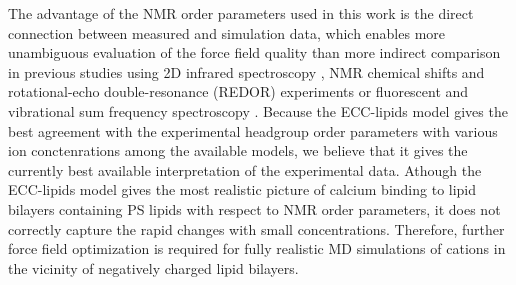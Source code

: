\documentclass[journal=jpcbfk,manuscript=article]{achemso}
\begin{document}


The advantage of the NMR order parameters used in this work is the direct connection between
measured and simulation data, which enables more unambiguous evaluation of the force field quality \cite{catte16,ollila16}
than more indirect comparison in previous studies using 2D infrared spectroscopy \cite{valentine18}, NMR chemical shifts and
rotational-echo double-resonance (REDOR) experiments \cite{hallock18} or fluorescent and vibrational sum frequency spectroscopy \cite{melcrova16}.
Because the ECC-lipids model gives the best agreement with the experimental headgroup order parameters
with various ion conctenrations among the available models, we believe that it gives the currently best available
interpretation of the experimental data. Athough the ECC-lipids model gives the most realistic picture of calcium binding to
lipid bilayers containing PS lipids with respect to NMR order parameters, it does not
correctly capture the rapid changes with small concentrations. Therefore, further
force field optimization is required for fully realistic MD simulations of cations
in the vicinity of negatively charged lipid bilayers.


\end{document}
